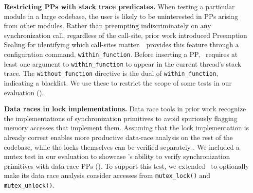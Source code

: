 {\bf Restricting PPs with stack trace predicates.}
When testing a particular module in a large codebase,
the user is likely to be uninterested in PPs arising from other modules.
Rather than preempting indiscriminately on any synchronization call, regardless of the call-site,
prior work introduced Preemption Sealing \cite{sealing} for identifying which call-sites matter.
\landslide~provides this feature through a configuration command, {\tt within\_function}.
Before inserting a PP, \landslide~requires at least one argument to {\tt within\_function} to appear in the current thread's stack trace.
The {\tt without\_\allowbreak{}function} directive is the dual of {\tt within\_function}, indicating a blacklist.
We use these to restrict the scope of some tests in our evaluation (\sect{\ref{sec:testsuite}}).

{\bf Data races in lock implementations.}
Data race tools in prior work \cite{tsan,portend} recognize the implementations of synchronization primitives to avoid spuriously flagging memory accesses %
that implement them.
Assuming that the lock implementation is already correct enables more productive data-race analysis on the rest of the codebase,
while the locks themselves can be verified separately \cite{dbug-thesis}.
We included a mutex test in our evaluation
to showcase \quicksand's ability to verify synchronization primitives with data-race PPs
(\sect{\ref{sec:testsuite}}).
To support this test, we extended \landslide~to
optionally make its data race analysis consider accesses from {\tt mutex\_lock()} and {\tt mutex\_unlock()}.


